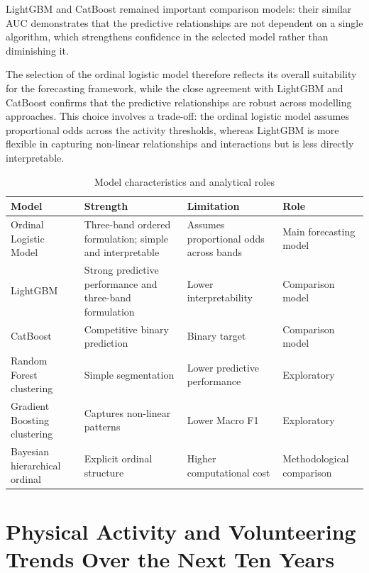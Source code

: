 \documentclass[ %
                    author={Ashrey Ashrey, Sanya Kapoor, Trisha Sharma, Yash Bhooshan Pandloskar},
                supervisor={Dr. Dalila O’Grady},
                    degree={MSc},
                     title={Using machine learning to forecast physical activity participation, volunteering and activity patterns in London},
                  subtitle={},
                      type={},
                      year={2021}]{dissertation}
\begin{document}
LightGBM and CatBoost remained important comparison models: their similar AUC demonstrates that the predictive relationships are not dependent on a single algorithm, which strengthens confidence in the selected model rather than diminishing it.

The selection of the ordinal logistic model therefore reflects its overall suitability for the forecasting framework, while the close agreement with LightGBM and CatBoost confirms that the predictive relationships are robust across modelling approaches. This choice involves a trade-off: the ordinal logistic model assumes proportional odds across the activity thresholds, whereas LightGBM is more flexible in capturing non-linear relationships and interactions but is less directly interpretable.

\begin{table}[!htb]
\centering
\small
\begin{tabular}{
>{\raggedright\arraybackslash}p{}
>{\raggedright\arraybackslash}p{}
>{\raggedright\arraybackslash}p{}
>{\raggedright\arraybackslash}p{}
}
\toprule
\textbf{Model} & \textbf{Strength} & \textbf{Limitation} & \textbf{Role} \\
\midrule
Ordinal Logistic Model & Three-band ordered formulation; simple and interpretable & Assumes proportional odds across bands & Main forecasting model \\
LightGBM & Strong predictive performance and three-band formulation & Lower interpretability & Comparison model \\
CatBoost & Competitive binary prediction & Binary target & Comparison model \\
Random Forest clustering & Simple segmentation & Lower predictive performance & Exploratory \\
Gradient Boosting clustering & Captures non-linear patterns & Lower Macro F1 & Exploratory \\
Bayesian hierarchical ordinal & Explicit ordinal structure & Higher computational cost & Methodological comparison \\
\bottomrule
\end{tabular}
\caption{Model characteristics and analytical roles}
\label{tab:model-selection}
\end{table}

\FloatBarrier
\section{Physical Activity and Volunteering Trends Over the Next Ten Years}
\end{document}
